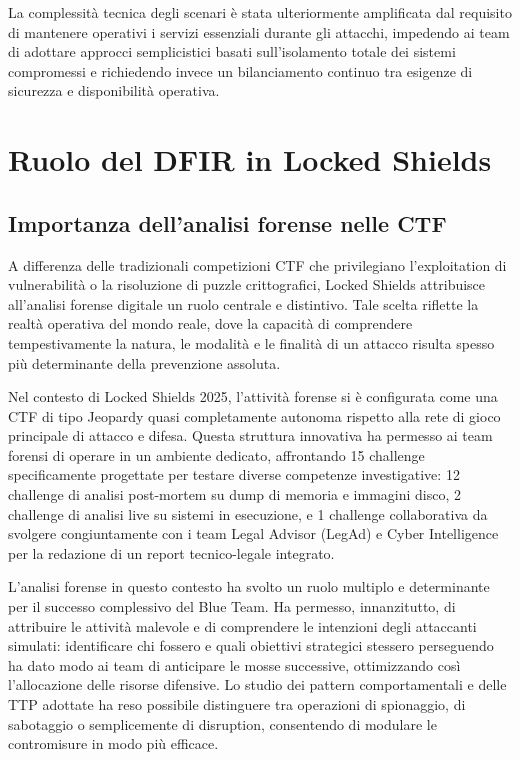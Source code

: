 La complessità tecnica degli scenari è stata ulteriormente amplificata dal requisito di mantenere operativi i servizi essenziali durante gli attacchi, impedendo ai team di adottare approcci semplicistici basati sull'isolamento totale dei sistemi compromessi e richiedendo invece un bilanciamento continuo tra esigenze di sicurezza e disponibilità operativa.

\section{Ruolo del DFIR in Locked Shields}

\subsection{Importanza dell'analisi forense nelle CTF}

A differenza delle tradizionali competizioni CTF che privilegiano l'exploitation di vulnerabilità o la risoluzione di puzzle crittografici, Locked Shields attribuisce all'analisi forense digitale un ruolo centrale e distintivo. Tale scelta riflette la realtà operativa del mondo reale, dove la capacità di comprendere tempestivamente la natura, le modalità e le finalità di un attacco risulta spesso più determinante della prevenzione assoluta.

Nel contesto di Locked Shields 2025, l'attività forense si è configurata come una CTF di tipo Jeopardy quasi completamente autonoma rispetto alla rete di gioco principale di attacco e difesa. Questa struttura innovativa ha permesso ai team forensi di operare in un ambiente dedicato, affrontando 15 challenge specificamente progettate per testare diverse competenze investigative: 12 challenge di analisi post-mortem su dump di memoria e immagini disco, 2 challenge di analisi live su sistemi in esecuzione, e 1 challenge collaborativa da svolgere congiuntamente con i team Legal Advisor (LegAd) e Cyber Intelligence per la redazione di un report tecnico-legale integrato.

L'analisi forense in questo contesto ha svolto un ruolo multiplo e determinante per il successo complessivo del Blue Team. Ha permesso, innanzitutto, di attribuire le attività malevole e di comprendere le intenzioni degli attaccanti simulati: identificare chi fossero e quali obiettivi strategici stessero perseguendo ha dato modo ai team di anticipare le mosse successive, ottimizzando così l’allocazione delle risorse difensive. Lo studio dei pattern comportamentali e delle TTP adottate ha reso possibile distinguere tra operazioni di spionaggio, di sabotaggio o semplicemente di disruption, consentendo di modulare le contromisure in modo più efficace.

